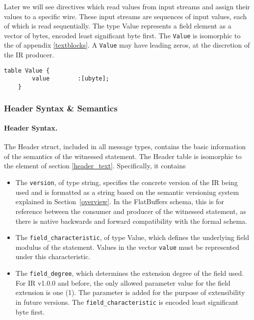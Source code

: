 Later we will see directives which read values from input streams and assign their values to a specific wire. These input streams are sequences of input values, each of which is read sequentially. The type \textsf{Value} represents a field element as a vector of bytes, encoded least significant byte first. The \texttt{Value} is isomorphic to the  of appendix \ref{textblocks}.
A \texttt{Value} may have leading zeros, at the discretion of the IR producer.

\begin{lstlisting}[style=fbslisting]
    table Value {
        value        :[ubyte];
    }
\end{lstlisting}

\subsubsection*{Header Syntax \& Semantics}

\paragraph{Header Syntax.} The \textsf{Header} struct, included in all message types, contains the basic information of the semantics of the witnessed statement. The \textsf{Header} table is isomorphic to the  element of section \ref{header_text}. Specifically, it contains

\begin{itemize}
  \item The \texttt{version}, of type string, specifies the concrete version of the IR being used and is formatted as a string based on the semantic versioning system explained in Section~\ref{overview}. In the FlatBuffers schema, this is for reference between the consumer and producer of the witnessed statement, as there is native backwards and forward compatibility with the formal schema.
  \item The \texttt{field\_characteristic}, of type \textsf{Value}, which defines the underlying field modulus of the statement. Values in the vector \texttt{value} must be represented under this characteristic.
  \item The \texttt{field\_degree}, which determines the extension degree of the field used. For IR v1.0.0 and before, the only allowed parameter value for the field extension is one (1). The parameter is added for the purpose of extensibility in future versions. The \texttt{field\_characteristic} is encoded least significant byte first.
\end{itemize}



